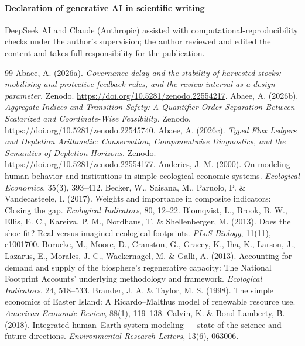 \documentclass[preprint,12pt,authoryear]{elsarticle}
\begin{document}
\paragraph{Declaration of generative AI in scientific writing} DeepSeek AI and Claude (Anthropic) assisted with computational-reproducibility checks under the author's supervision; the author reviewed and edited the content and takes full responsibility for the publication.
\begin{thebibliography}{99}
 Abaee, A. (2026a). \emph{Governance delay and the stability of harvested stocks: mobilising and protective feedback rules, and the review interval as a design parameter.} Zenodo. \url{https://doi.org/10.5281/zenodo.22554217}.
 Abaee, A. (2026b). \emph{Aggregate Indices and Transition Safety: A Quantifier-Order Separation Between Scalarized and Coordinate-Wise Feasibility.} Zenodo. \url{https://doi.org/10.5281/zenodo.22545740}.
 Abaee, A. (2026c). \emph{Typed Flux Ledgers and Depletion Arithmetic: Conservation, Componentwise Diagnostics, and the Semantics of Depletion Horizons.} Zenodo. \url{https://doi.org/10.5281/zenodo.22554177}.
 Anderies, J. M. (2000). On modeling human behavior and institutions in simple ecological economic systems. \emph{Ecological Economics}, 35(3), 393--412.
 Becker, W., Saisana, M., Paruolo, P. \& Vandecasteele, I. (2017). Weights and importance in composite indicators: Closing the gap. \emph{Ecological Indicators}, 80, 12--22.
 Blomqvist, L., Brook, B. W., Ellis, E. C., Kareiva, P. M., Nordhaus, T. \& Shellenberger, M. (2013). Does the shoe fit? Real versus imagined ecological footprints. \emph{PLoS Biology}, 11(11), e1001700.
 Borucke, M., Moore, D., Cranston, G., Gracey, K., Iha, K., Larson, J., Lazarus, E., Morales, J. C., Wackernagel, M. \& Galli, A. (2013). Accounting for demand and supply of the biosphere's regenerative capacity: The National Footprint Accounts' underlying methodology and framework. \emph{Ecological Indicators}, 24, 518--533.
 Brander, J. A. \& Taylor, M. S. (1998). The simple economics of Easter Island: A Ricardo--Malthus model of renewable resource use. \emph{American Economic Review}, 88(1), 119--138.
 Calvin, K. \& Bond-Lamberty, B. (2018). Integrated human--Earth system modeling --- state of the science and future directions. \emph{Environmental Research Letters}, 13(6), 063006.

\end{thebibliography}
\end{document}
